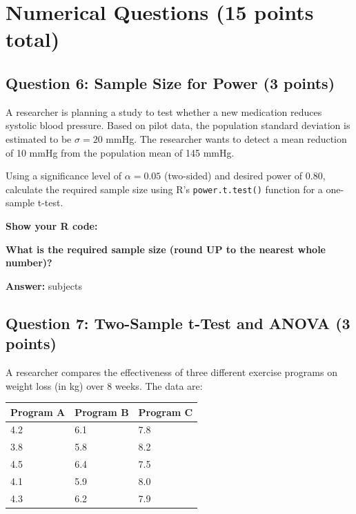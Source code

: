 \documentclass[11pt]{article}
\begin{document}
\newpage

\section*{Numerical Questions (15 points total)}

\subsection*{Question 6: Sample Size for Power (3 points)}

A researcher is planning a study to test whether a new medication reduces systolic blood pressure. Based on pilot data, the population standard deviation is estimated to be $\sigma = 20$ mmHg. The researcher wants to detect a mean reduction of 10 mmHg from the population mean of 145 mmHg.

\vspace{0.3cm}

Using a significance level of $\alpha = 0.05$ (two-sided) and desired power of 0.80, calculate the required sample size using R's \texttt{power.t.test()} function for a one-sample t-test.

\vspace{0.3cm}

\textbf{Show your R code:}

\vspace{3cm}

\textbf{What is the required sample size (round UP to the nearest whole number)?}

\vspace{0.3cm}

\textbf{Answer:} \underline{\hspace{3cm}} subjects

\vspace{1cm}

\subsection*{Question 7: Two-Sample t-Test and ANOVA (3 points)}

A researcher compares the effectiveness of three different exercise programs on weight loss (in kg) over 8 weeks. The data are:

\vspace{0.3cm}

\begin{center}
\begin{tabular}{lll}
\toprule
Program A & Program B & Program C \\
\midrule
4.2 & 6.1 & 7.8 \\
3.8 & 5.8 & 8.2 \\
4.5 & 6.4 & 7.5 \\
4.1 & 5.9 & 8.0 \\
4.3 & 6.2 & 7.9 \\
\bottomrule
\end{tabular}
\end{center}
\end{document}

